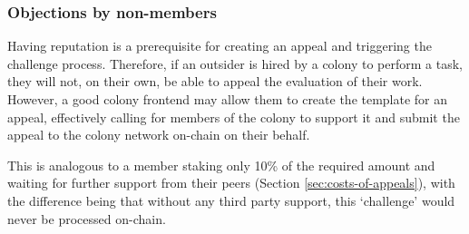 \subsubsection{Objections by non-members}

Having reputation is a prerequisite for creating an appeal and triggering the challenge process. Therefore, if an outsider is hired by a colony to perform a task, they will not, on their own, be able to appeal the evaluation of their work. However, a good colony frontend may allow them to create the template for an appeal, effectively calling for members of the colony to support it and submit the appeal to the colony network on-chain on their behalf.

This is analogous to a member staking only 10\% of the required amount and waiting for further support from their peers (Section \ref{sec:costs-of-appeals}), with the difference being that without any third party support, this `challenge' would never be processed on-chain.
